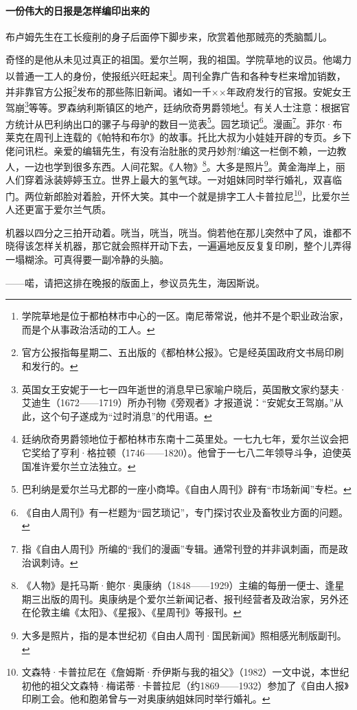 \paragraph*{一份伟大的日报是怎样编印出来的}
\par 布卢姆先生在工长瘦削的身子后面停下脚步来，欣赏着他那贼亮的秃脑瓢儿。
\par 奇怪的是他从未见过真正的祖国。爱尔兰啊，我的祖国。学院草地的议员。他竭力以普通一工人的身份，使报纸兴旺起来\footnote{学院草地是位于都柏林市中心的一区。南尼蒂常说，他并不是个职业政治家，而是个从事政治活动的工人。}。周刊全靠广告和各种专栏来增加销数，并非靠官方公报\footnote{官方公报指每星期二、五出版的《都柏林公报》。它是经英国政府文书局印刷和发行的。}发布的那些陈旧新闻。诸如一千××年政府发行的官报。安妮女王驾崩\footnote{英国女王安妮于一七一四年逝世的消息早已家喻户晓后，英国散文家约瑟夫·艾迪生（1672——1719）所办刊物《旁观者》才报道说：“安妮女王驾崩。”从此，这个句子遂成为“过时消息”的代用语。}等等。罗森纳利斯镇区的地产，廷纳欣奇男爵领地\footnote{廷纳欣奇男爵领地位于都柏林市东南十二英里处。一七九七年，爱尔兰议会把它奖给了亨利·格拉顿（1746——1820）。他曾于一七八二年领导斗争，迫使英国准许爱尔兰立法独立。}。有关人士注意：根据官方统计从巴利纳出口的骡子与母驴的数目一览表\footnote{巴利纳是爱尔兰马尤郡的一座小商埠。《自由人周刊》辟有“市场新闻”专栏。}。园艺琐记\footnote{《自由人周刊》有一栏题为“园艺琐记”，专门探讨农业及畜牧业方面的问题。}。漫画\footnote{指《自由人周刊》所编的“我们的漫画”专辑。通常刊登的并非讽刺画，而是政治讽刺诗。}。菲尔·布莱克在周刊上连载的《帕特和布尔》的故事。托比大叔为小娃娃开辟的专页。乡下佬问讯栏。亲爱的编辑先生，有没有治肚胀的灵丹妙剂?编这一栏倒不赖，一边教人，一边也学到很多东西。人间花絮。《人物》\footnote{《人物》是托马斯·鲍尔·奥康纳（1848——1929）主编的每册一便士、逢星期三出版的周刊。奥康纳是个爱尔兰新闻记者、报刊经营者及政治家，另外还在伦敦主编《太阳》、《星报》、《星周刊》等报刊。}。大多是照片\footnote{大多是照片，指的是本世纪初《自由人周刊·国民新闻》照相感光制版副刊。}。黄金海岸上，丽人们穿着泳装婷婷玉立。世界上最大的氢气球。一对姐妹同时举行婚礼，双喜临门。两位新郎脸对着脸，开怀大笑。其中一个就是排字工人卡普拉尼\footnote{文森特·卡普拉尼在《詹姆斯·乔伊斯与我的祖父》（1982）一文中说，本世纪初他的祖父文森特·梅诺蒂·卡普拉尼（约1869——1932）参加了《自由人报》印刷工会。他和胞弟曾与一对奥康纳姐妹同时举行婚礼。}，比爱尔兰人还更富于爱尔兰气质。
\par 机器以四分之三拍开动着。咣当，咣当，咣当。倘若他在那儿突然中了风，谁都不晓得该怎样关机器，那它就会照样开动下去，一遍遍地反反复复印刷，整个儿弄得一塌糊涂。可真得要一副冷静的头脑。
\par ——喏，请把这排在晚报的版面上，参议员先生，海因斯说。
